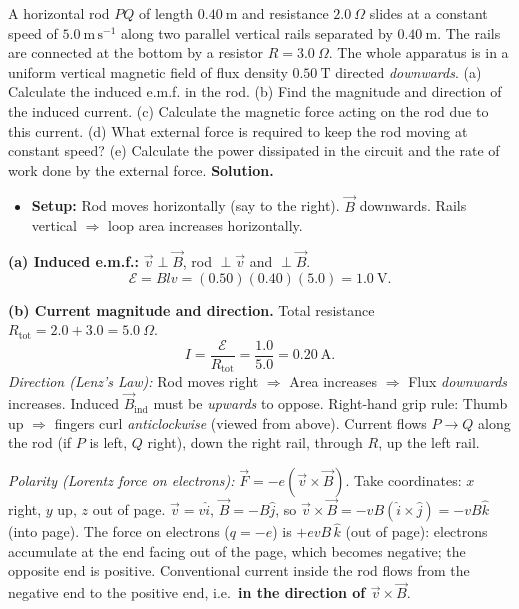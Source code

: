 \documentclass[11pt]{article}
\begin{document}
\begin{exoresolu}
A horizontal rod $PQ$ of length $0.40\ \mathrm{m}$ and resistance $2.0\ \Omega$ slides at a constant speed of $5.0\ \mathrm{m\,s^{-1}}$ along two parallel vertical rails separated by $0.40\ \mathrm{m}$. The rails are connected at the bottom by a resistor $R = 3.0\ \Omega$. The whole apparatus is in a uniform vertical magnetic field of flux density $0.50\ \mathrm{T}$ directed \emph{downwards}. (a) Calculate the induced e.m.f. in the rod. (b) Find the magnitude and direction of the induced current. (c) Calculate the magnetic force acting on the rod due to this current. (d) What external force is required to keep the rod moving at constant speed? (e) Calculate the power dissipated in the circuit and the rate of work done by the external force.
\tcblower
\textbf{Solution.}
\begin{itemize}
\item \textbf{Setup:} Rod moves horizontally (say to the right). $\vec{B}$ downwards. Rails vertical $\Rightarrow$ loop area increases horizontally.
\end{itemize}
\textbf{(a) Induced e.m.f.:} $\vec{v} \perp \vec{B}$, rod $\perp \vec{v}$ and $\perp \vec{B}$.
\[
\mathcal{E} = Blv = (0.50)(0.40)(5.0) = \boxed{1.0\ \mathrm{V}}.
\]

\textbf{(b) Current magnitude and direction.}
Total resistance $R_{\text{tot}} = 2.0 + 3.0 = 5.0\ \Omega$.
\[
I = \frac{\mathcal{E}}{R_{\text{tot}}} = \frac{1.0}{5.0} = \boxed{0.20\ \mathrm{A}}.
\]
\textit{Direction (Lenz's Law):} Rod moves right $\Rightarrow$ Area increases $\Rightarrow$ Flux \emph{downwards} increases. Induced $\vec{B}_{\text{ind}}$ must be \emph{upwards} to oppose. Right-hand grip rule: Thumb up $\Rightarrow$ fingers curl \emph{anticlockwise} (viewed from above). Current flows $P \to Q$ along the rod (if $P$ is left, $Q$ right), down the right rail, through $R$, up the left rail.

\textit{Polarity (Lorentz force on electrons):} $\vec{F} = -e(\vec{v} \times \vec{B})$. Take coordinates: $x$ right, $y$ up, $z$ out of page. $\vec{v}=v\hat{i}$, $\vec{B}=-B\hat{j}$, so $\vec{v}\times\vec{B} = -vB(\hat{i}\times\hat{j}) = -vB\hat{k}$ (into page). The force on electrons ($q=-e$) is $+evB\,\hat{k}$ (out of page): electrons accumulate at the end facing out of the page, which becomes negative; the opposite end is positive. Conventional current inside the rod flows from the negative end to the positive end, i.e.\ \textbf{in the direction of $\vec{v}\times\vec{B}$}.


\end{exoresolu}
\end{document}
